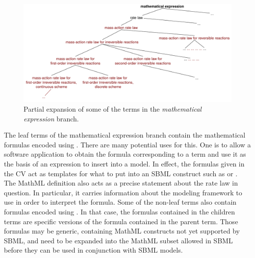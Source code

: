 \begin{figure}[tbh]
  \centering
  \vspace*{-1ex}
  \includegraphics[scale = 0.68, trim=10 0 0 0]{figs/sbo-math-expression}
  \caption{Partial expansion of some of the terms in the \emph{mathematical
      expression} branch.}
  \label{fig:sbo-math-expression}
\end{figure}

The leaf terms of the mathematical expression branch contain the
mathematical formulas encoded using \mathmltwo.  There are many
potential uses for this.  One is to allow a software application
to obtain the formula corresponding to a term and use it as the
basis of an expression to insert into a model.  In effect, the
formulas given in the CV act as templates for what to put into an
SBML construct such as \KineticLaw or \Rule.  The MathML
definition also acts as a precise statement about the rate law in
question. In particular, it carries information about the modeling
framework to use in order to interpret the formula.  Some of the
non-leaf terms also contain formulas encoded using \mathmltwo. In
that case, the formulas contained in the children terms are
specific versions of the formula contained in the parent term.
Those formulas may be generic, containing MathML constructs not
yet supported by SBML, and need to be expanded into the MathML
subset allowed in SBML before they can be used in conjunction with
SBML models.

